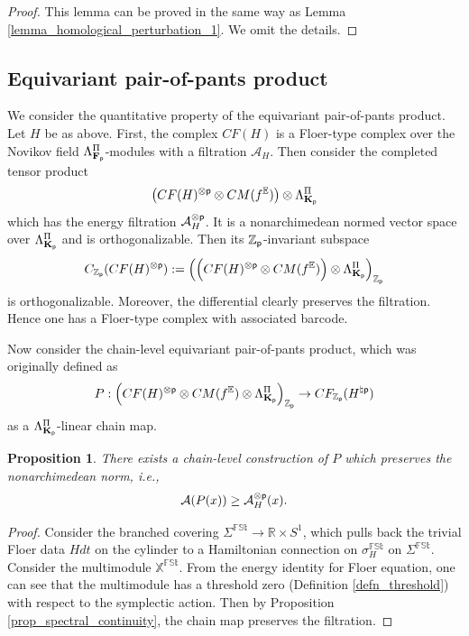 \documentclass[reqno, 10pt]{amsart}
\numberwithin{equation}{section}
\numberwithin{equation}{section}
\newtheorem{prop}[thm]{Proposition}
\theoremstyle{definition}
\theoremstyle{remark}
\newcommand{\beqn}{\begin{equation*}}
\newcommand{\eeqn}{\end{equation*}}
\newcommand{\mb}{\mathbb}
\newcommand{\mc}{\mathcal}
\newcommand{\p}{{\sf p}}
\newcommand{\fp}{{\bf F}_{\sf p}}
\newcommand{\kp}{{\bf K}_{\sf p}}
\newcommand{\zp}{{{\mb Z}_{\sf p}}}
\newcommand{\ep}{{{\mathbb E}}}
\begin{document}
\begin{proof}
This lemma can be proved in the same way as Lemma \ref{lemma_homological_perturbation_1}. We omit the details.
\end{proof}









\subsection{Equivariant pair-of-pants product}

We consider the quantitative property of the equivariant pair-of-pants product. Let $H$ be as above. First, the complex $CF (H)$ is a Floer-type complex over the Novikov field $\Lambda_{\fp}^{\Pi}$-modules with a filtration ${\mc A}_H$. Then consider the completed tensor product
\beqn
\left( CF(H)^{\otimes \p} \otimes CM(f^\ep) \right) \otimes \Lambda_{\kp}^{\Pi}
\eeqn
which has the energy filtration ${\mc A}_H^{\otimes \p}$. It is a nonarchimedean normed vector space over $\Lambda_{\kp}^{\Pi}$ and is orthogonalizable. Then its $\zp$-invariant subspace
\beqn
C_{\zp}( CF(H)^{\otimes \p}):= \Big( \Big(  CF(H)^{\otimes \p} \otimes CM(f^\ep)\Big)\otimes \Lambda_{\kp}^{\Pi}  \Big)_{\zp}
\eeqn
is orthogonalizable. Moreover, the differential clearly preserves the filtration. Hence one has a Floer-type complex with associated barcode. 

Now consider the chain-level equivariant pair-of-pants product, which was originally defined as 
\beqn
P: \Big( CF(H)^{\otimes \p}\otimes CM(f^\ep) \otimes \Lambda_{\kp}^\Pi \Big)_{\zp} \to CF_{\zp}(H^{\natural \p})
\eeqn
as a $\Lambda_{\kp}^{\Pi}$-linear chain map. 

\begin{prop}
There exists a chain-level construction of $P$ which preserves the nonarchimedean norm, i.e., 
\beqn
{\mc A}(P (x)) \geq {\mc A}_H^{\otimes \p} (x).
\eeqn
\end{prop}

\begin{proof}
Consider the branched covering $\Sigma^{\mb{FSt}} \to {\mb R}\times S^1$, which pulls back the trivial Floer data $H dt$ on the cylinder to a Hamiltonian connection on $\sigma_H^{\mb{FSt}}$ on $\Sigma^{\mb{FSt}}$. Consider the multimodule $\mb{X}^{\mb{FSt}}$. From the energy identity for Floer equation, one can see that the multimodule has a threshold zero (Definition \ref{defn_threshold}) with respect to the symplectic action. Then by Proposition \ref{prop_spectral_continuity}, the chain map preserves the filtration.
\end{proof}
\end{document}
